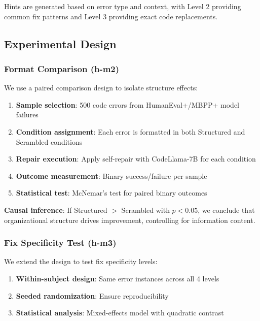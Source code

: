 Hints are generated based on error type and context, with Level 2 providing common fix patterns and Level 3 providing exact code replacements.

\subsection{Experimental Design}

\subsubsection{Format Comparison (h-m2)}

We use a paired comparison design to isolate structure effects:

\begin{enumerate}
    \item \textbf{Sample selection}: 500 code errors from HumanEval+/MBPP+ model failures
    \item \textbf{Condition assignment}: Each error is formatted in both Structured and Scrambled conditions
    \item \textbf{Repair execution}: Apply self-repair with CodeLlama-7B for each condition
    \item \textbf{Outcome measurement}: Binary success/failure per sample
    \item \textbf{Statistical test}: McNemar's test for paired binary outcomes
\end{enumerate}

\textbf{Causal inference}: If Structured $>$ Scrambled with $p < 0.05$, we conclude that organizational structure drives improvement, controlling for information content.

\subsubsection{Fix Specificity Test (h-m3)}

We extend the design to test fix specificity levels:

\begin{enumerate}
    \item \textbf{Within-subject design}: Same error instances across all 4 levels
    \item \textbf{Seeded randomization}: Ensure reproducibility
    \item \textbf{Statistical analysis}: Mixed-effects model with quadratic contrast
\end{enumerate}

